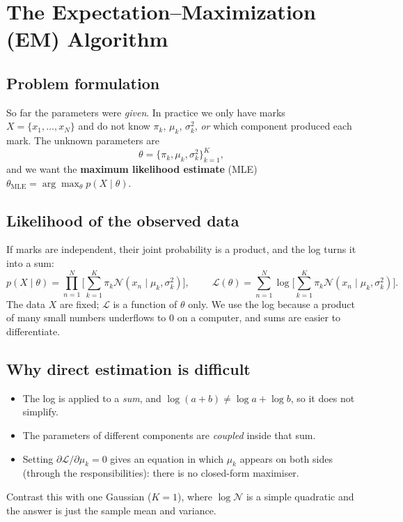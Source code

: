 \documentclass[11pt,a4paper]{article}
\newcommand{\N}{\mathcal{N}}
\newcommand{\LL}{\mathcal{L}}
\begin{document}
\section{The Expectation--Maximization (EM) Algorithm}

\subsection{Problem formulation}

So far the parameters were \emph{given}. In practice we only have marks $X=\{x_1,\dots,x_N\}$ and do not know $\pi_k$, $\mu_k$, $\sigma_k^2$, \emph{or} which component produced each mark. The unknown parameters are
\[
\theta=\{\pi_k,\mu_k,\sigma_k^2\}_{k=1}^K,
\]
and we want the \textbf{maximum likelihood estimate} (MLE)
$\theta_{\text{MLE}}=\arg\max_\theta p(X\mid\theta)$.

\subsection{Likelihood of the observed data}

If marks are independent, their joint probability is a product, and the log turns it into a sum:
\[
p(X\mid\theta)=\prod_{n=1}^N\Big[\sum_{k=1}^K\pi_k\N(x_n\mid\mu_k,\sigma_k^2)\Big],
\qquad
\boxed{\;\LL(\theta)=\sum_{n=1}^N\log\Big[\sum_{k=1}^K\pi_k\N(x_n\mid\mu_k,\sigma_k^2)\Big].\;}
\]
The data $X$ are fixed; $\LL$ is a function of $\theta$ only. We use the log because a product of many small numbers underflows to $0$ on a computer, and sums are easier to differentiate.

\subsection{Why direct estimation is difficult}

\begin{itemize}[nosep]
\item The log is applied to a \emph{sum}, and $\log(a+b)\ne\log a+\log b$, so it does not simplify.
\item The parameters of different components are \emph{coupled} inside that sum.
\item Setting $\partial\LL/\partial\mu_k=0$ gives an equation in which $\mu_k$ appears on both sides (through the responsibilities): there is no closed-form maximiser.
\end{itemize}
Contrast this with one Gaussian ($K=1$), where $\log\N$ is a simple quadratic and the answer is just the sample mean and variance.
\end{document}
